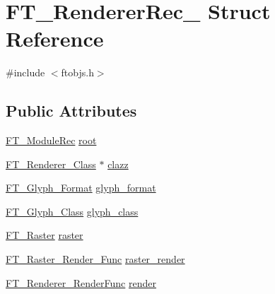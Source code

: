 \hypertarget{struct_f_t___renderer_rec__}{\section{F\-T\-\_\-\-Renderer\-Rec\-\_\- Struct Reference}
\label{struct_f_t___renderer_rec__}
}


{\ttfamily \#include $<$ftobjs.\-h$>$}

\subsection*{Public Attributes}
\begin{DoxyCompactItemize}
\item 
\hyperlink{ftobjs_8h_adab1941496d5a44d1a8c2a822c24cfe9}{F\-T\-\_\-\-Module\-Rec} \hyperlink{struct_f_t___renderer_rec___a7c93326898f03a9eb224f57104fa2433}{root}
\item 
\hyperlink{ftrender_8h_a45a715d897a340ee66d1e848bf89d0d4}{F\-T\-\_\-\-Renderer\-\_\-\-Class} $\ast$ \hyperlink{struct_f_t___renderer_rec___a2b13c0a776ea7f589f41f576f9c4e8ad}{clazz}
\item 
\hyperlink{ftimage_8h_aeca0d10a27aedecbf96515e0628aff1f}{F\-T\-\_\-\-Glyph\-\_\-\-Format} \hyperlink{struct_f_t___renderer_rec___a478b14f577b633cea7043fb17d404721}{glyph\-\_\-format}
\item 
\hyperlink{ftglyph_8h_ad05b3999d93247f41f1c4ac20ea0104b}{F\-T\-\_\-\-Glyph\-\_\-\-Class} \hyperlink{struct_f_t___renderer_rec___a38a591be1d20fb2b4d81e48ebb624dd7}{glyph\-\_\-class}
\item 
\hyperlink{ftimage_8h_a6774d2eb4bf030daf319aa6b56347431}{F\-T\-\_\-\-Raster} \hyperlink{struct_f_t___renderer_rec___a9c54a2da84f5892e0563d032ebd1ee09}{raster}
\item 
\hyperlink{ftimage_8h_a469b1d3125d0032b8c66df3179832657}{F\-T\-\_\-\-Raster\-\_\-\-Render\-\_\-\-Func} \hyperlink{struct_f_t___renderer_rec___a6dc07268fc39d9dde130a5708607d19d}{raster\-\_\-render}
\item 
\hyperlink{ftrender_8h_ada485fdd7f97be351db11403a9b82d9f}{F\-T\-\_\-\-Renderer\-\_\-\-Render\-Func} \hyperlink{struct_f_t___renderer_rec___a197bfeb9dde4aef8eee87bc3ea95312e}{render}
\end{DoxyCompactItemize}


